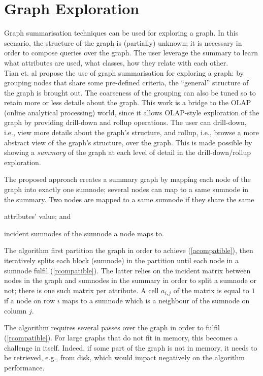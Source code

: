 \section{Graph Exploration}
\label{chap03:review:graph-exploration}

Graph summarisation techniques can be used for exploring a graph. In this scenario, the structure of the graph is (partially) unknown; it is necessary in order to compose queries over the graph. The user leverage the summary to learn what attributes are used, what classes, how they relate with each other.\\

Tian et. al \cite{tian:sigmod:2008} propose the use of graph summarisation for exploring a graph: by grouping nodes that share some pre-defined criteria, the ``general'' structure of the graph is brought out. The coarseness of the grouping can also be tuned so to retain more or less details about the graph. This work is a bridge to the OLAP (online analytical processing) world, since it allows OLAP-style exploration of the graph by providing drill-down and rollup operations. The user can drill-down, i.e., view more details about the graph's structure, and rollup, i.e., browse a more abstract view of the graph's structure, over the graph. This is made possible by showing a \emph{summary} of the graph at each level of detail in the drill-down/rollup exploration.

The proposed approach creates a summary graph by mapping each node of the graph into exactly one sumnode; several nodes can map to a same sumnode in the summary. Two nodes are mapped to a same sumnode if they share the same
\begin{inparaenum}[(a)]
	\item attributes' value; and
	\label{acompatible}
	\item incident sumnodes of the sumnode a node maps to.
	\label{rcompatible}
\end{inparaenum}
The algorithm first partition the graph in order to achieve (\ref{acompatible}), then iteratively splits each block (sumnode) in the partition until each node in a sumnode fulfil (\ref{rcompatible}). The latter relies on the incident matrix between nodes in the graph and sumnodes in the summary in order to split a sumnode or not; there is one such matrix per attribute. A cell $a_{i,j}$ of the matrix is equal to $1$ if a node on row $i$ maps to a sumnode which is a neighbour of the sumnode on column $j$.

The algorithm requires several passes over the graph in order to fulfil (\ref{rcompatible}). For large graphs that do not fit in memory, this becomes a challenge in itself. Indeed, if some part of the graph is not in memory, it needs to be retrieved, e.g., from disk, which would impact negatively on the algorithm performance.

